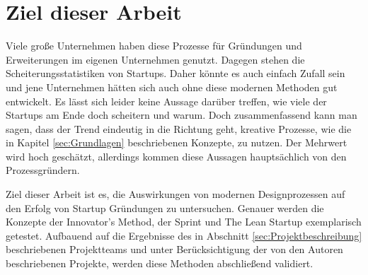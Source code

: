 \section{Ziel dieser Arbeit}
Viele große Unternehmen haben diese Prozesse für Gründungen und Erweiterungen im eigenen Unternehmen genutzt. Dagegen stehen die Scheiterungsstatistiken von Startups. Daher könnte es auch einfach Zufall sein und jene Unternehmen hätten sich auch ohne diese modernen Methoden gut entwickelt. Es lässt sich leider keine Aussage darüber treffen, wie viele der Startups am Ende doch scheitern und warum. Doch zusammenfassend kann man sagen, dass der Trend eindeutig in die Richtung geht, kreative Prozesse, wie die in Kapitel \ref{sec:Grundlagen} beschriebenen Konzepte, zu nutzen. Der Mehrwert wird hoch geschätzt, allerdings kommen diese Aussagen hauptsächlich von den Prozessgründern.

Ziel dieser Arbeit ist es, die Auswirkungen von modernen Designprozessen auf den Erfolg von Startup Gründungen zu untersuchen. Genauer werden die Konzepte der Innovator's Method, der Sprint und The Lean Startup exemplarisch getestet. Aufbauend auf die Ergebnisse des in Abschnitt \ref{sec:Projektbeschreibung} beschriebenen Projektteams und unter Berücksichtigung der von den Autoren beschriebenen Projekte, werden diese Methoden abschließend validiert. 